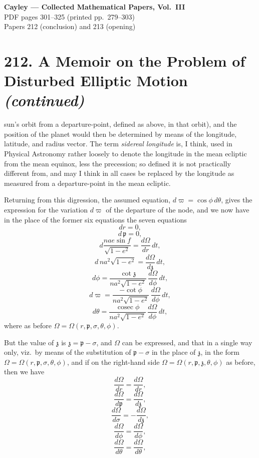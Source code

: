 \documentclass[11pt]{article}
\begin{document}
\begin{center}
{\Large\bfseries Cayley --- Collected Mathematical Papers, Vol.\ III}\\[0.5em]
{\large PDF pages 301--325 (printed pp.~279--303)}\\[0.5em]
{\small Papers 212 (conclusion) and 213 (opening)}
\end{center}

\bigskip


\section*{212. A Memoir on the Problem of Disturbed Elliptic Motion \textit{(continued)}}

\medskip
{} sun's orbit from a departure-point, defined as above, in that orbit), and the position of the planet would then be determined by means of the longitude, latitude, and radius vector. The term \emph{sidereal longitude} is, I think, used in Physical Astronomy rather loosely to denote the longitude in the mean ecliptic from the mean equinox, less the precession; so defined it is not practically different from, and may I think in all cases be replaced by the longitude as measured from a departure-point in the mean ecliptic.

\medskip
\noindent Returning from this digression, the assumed equation, $d\varpi=\cos\phi\,d\theta$, gives the expression for the variation $d\varpi$ of the departure of the node, and we now have in the place of the former six equations the seven equations
\[
dr = 0,
\]
\[
d\,\mathfrak{p} = 0,
\]
\[
d\frac{nae\sin f}{\sqrt{1-e^{2}}} = \frac{d\Omega}{dr}\,dt,
\]
\[
d\,na^{2}\sqrt{1-e^{2}} = \frac{d\Omega}{d\mathfrak{z}}\,dt,
\]
\[
d\phi = \frac{\cot\mathfrak{z}}{na^{2}\sqrt{1-e^{2}}}\,\frac{d\Omega}{d\phi}\,dt,
\]
\[
d\varpi = \frac{-\cot\phi}{na^{2}\sqrt{1-e^{2}}}\,\frac{d\Omega}{d\phi}\,dt,
\]
\[
d\theta = \frac{\operatorname{cosec}\phi}{na^{2}\sqrt{1-e^{2}}}\,\frac{d\Omega}{d\phi}\,dt,
\]
where as before $\Omega=\Omega(r,\mathfrak{p},\sigma,\theta,\phi)$.

\medskip
\noindent But the value of $\mathfrak{z}$ is $\mathfrak{z}=\mathfrak{p}-\sigma$, and $\Omega$ can be expressed, and that in a single way only, viz.\ by means of the substitution of $\mathfrak{p}-\sigma$ in the place of $\mathfrak{z}$, in the form $\Omega = \Omega(r,\mathfrak{p},\sigma,\theta,\phi)$, and if on the right-hand side $\Omega=\Omega(r,\mathfrak{p},\mathfrak{z},\theta,\phi)$ as before, then we have
\[
\frac{d\Omega}{dr} = \frac{d\Omega}{dr},
\]
\[
\frac{d\Omega}{d\mathfrak{p}} = \frac{d\Omega}{d\mathfrak{z}},
\]
\[
\frac{d\Omega}{d\sigma} = -\frac{d\Omega}{d\mathfrak{z}},
\]
\[
\frac{d\Omega}{d\phi} = \frac{d\Omega}{d\phi},
\]
\[
\frac{d\Omega}{d\theta} = \frac{d\Omega}{d\theta},
\]
\end{document}
